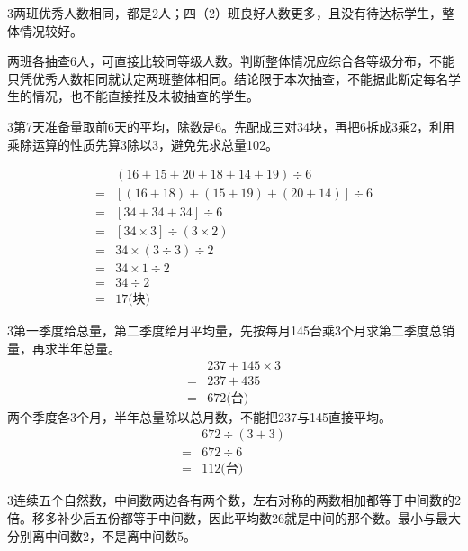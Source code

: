 \documentclass[multi=snippet,border={5bp 20bp 5bp 5bp}]{standalone}
\newenvironment{snippet}[3]{\begin{minipage}{#1bp}\color{answerred}\fontsize{#2}{#3}\selectfont\raggedright}{\end{minipage}}
\begin{document}
\begin{snippet}{505}{11.5}{14}\begin{multicols}{3}\raggedcolumns 两班优秀人数相同，都是2人；四（2）班良好人数更多，且没有待达标学生，整体情况较好。\par 两班各抽查6人，可直接比较同等级人数。判断整体情况应综合各等级分布，不能只凭优秀人数相同就认定两班整体相同。结论限于本次抽查，不能据此断定每名学生的情况，也不能直接推及未被抽查的学生。\end{multicols}\end{snippet}
\begin{snippet}{505}{11.5}{14}\begin{multicols}{3}\raggedcolumns 第7天准备量取前6天的平均，除数是6。先配成三对34块，再把6拆成3乘2，利用乘除运算的性质先算3除以3，避免先求总量102。\end{multicols}\[\begin{aligned}&(16+15+20+18+14+19)\div6\\={}&[(16+18)+(15+19)+(20+14)]\div6\\={}&[34+34+34]\div6\\={}&[34\times3]\div(3\times2)\\={}&34\times(3\div3)\div2\\={}&34\times1\div2\\={}&34\div2\\={}&17\text{(块)}\end{aligned}\]\end{snippet}
\begin{snippet}{505}{11.5}{14}\begin{multicols}{3}\raggedcolumns 第一季度给总量，第二季度给月平均量，先按每月145台乘3个月求第二季度总销量，再求半年总量。\[\begin{aligned}&237+145\times3\\={}&237+435\\={}&672\text{(台)}\end{aligned}\]两个季度各3个月，半年总量除以总月数，不能把237与145直接平均。\[\begin{aligned}&672\div(3+3)\\={}&672\div6\\={}&112\text{(台)}\end{aligned}\]\end{multicols}\end{snippet}
\begin{snippet}{505}{11.5}{14}\begin{multicols}{3}\raggedcolumns 连续五个自然数，中间数两边各有两个数，左右对称的两数相加都等于中间数的2倍。移多补少后五份都等于中间数，因此平均数26就是中间的那个数。最小与最大分别离中间数2，不是离中间数5。\end{multicols}\end{snippet}
\end{document}
